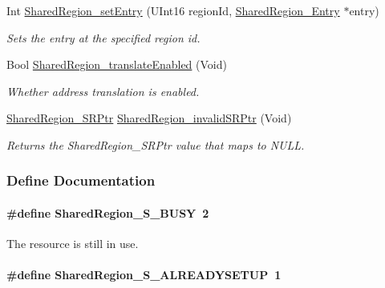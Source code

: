 \begin{DoxyCompactItemize}
Int \hyperlink{_shared_region_8h_a03f6986f76660e57a41ee312545e9f7d}{SharedRegion\_\-setEntry} (UInt16 regionId, \hyperlink{struct_shared_region___entry}{SharedRegion\_\-Entry} $\ast$entry)
\begin{DoxyCompactList}\small\item\em Sets the entry at the specified region id. \item\end{DoxyCompactList}\item 
Bool \hyperlink{_shared_region_8h_ab6d47a56e271184d92158e88810e9063}{SharedRegion\_\-translateEnabled} (Void)
\begin{DoxyCompactList}\small\item\em Whether address translation is enabled. \item\end{DoxyCompactList}\item 
\hyperlink{_shared_region_8h_a3efe06da0fa1fcbb3b271278ddd9b410}{SharedRegion\_\-SRPtr} \hyperlink{_shared_region_8h_a9ed41a1be03f81e10b150921c1035467}{SharedRegion\_\-invalidSRPtr} (Void)
\begin{DoxyCompactList}\small\item\em Returns the SharedRegion\_\-SRPtr value that maps to NULL. \item\end{DoxyCompactList}\end{DoxyCompactItemize}


\subsubsection{Define Documentation}
\paragraph[{SharedRegion\_\-S\_\-BUSY}]{\setlength{\rightskip}{0pt plus 5cm}\#define SharedRegion\_\-S\_\-BUSY~2}\hfill\label{_shared_region_8h_a6600547ee6e6f87175f7031004206e9e}


The resource is still in use. 

\paragraph[{SharedRegion\_\-S\_\-ALREADYSETUP}]{\setlength{\rightskip}{0pt plus 5cm}\#define SharedRegion\_\-S\_\-ALREADYSETUP~1}\hfill\label{_shared_region_8h_a016c010c7acdf21d0138f54002eb1783}


